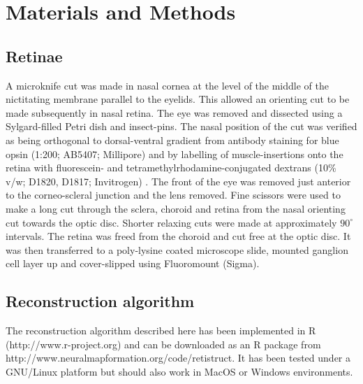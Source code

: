 \documentclass[10pt]{article}
\begin{document}

\section*{Materials and Methods}
\label{retistruct_plos:sec:materials-methods}

\subsection*{Retinae}
\label{retistruct_plos:sec:retinae}

A microknife cut was made in nasal cornea at the level of the middle
of the nictitating membrane parallel to the eyelids. This allowed an
orienting cut to be made subsequently in nasal retina. The eye was
removed and dissected using a Sylgard-filled Petri dish and
insect-pins. The nasal position of the cut was verified as being
orthogonal to dorsal-ventral gradient from antibody staining for blue
opsin (1:200; AB5407; Millipore) and by labelling of muscle-insertions
onto the retina with fluorescein- and tetramethylrhodamine-conjugated
dextrans (10\% v/w; D1820, D1817; Invitrogen)
. The front of the eye was
removed just anterior to the corneo-scleral junction and the lens
removed. Fine scissors were used to make a long cut through the
sclera, choroid and retina from the nasal orienting cut towards the
optic disc. Shorter relaxing cuts were made at approximately
$90^\circ$ intervals. The retina was freed from the choroid and cut
free at the optic disc. It was then transferred to a poly-lysine
coated microscope slide, mounted ganglion cell layer up and
cover-slipped using Fluoromount (Sigma).

\subsection*{Reconstruction algorithm}
\label{retistruct_plos:sec:reconstr-algor}

The reconstruction algorithm described here has been implemented in R
(http://www.r-project.org) and can be downloaded as an R package from
http://www.neuralmapformation.org/code/retistruct. It has been tested
under a GNU/Linux platform but should also work in MacOS or Windows
environments.
\end{document}
